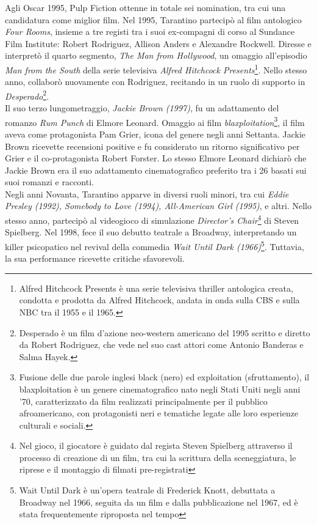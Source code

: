 \documentclass[12pt]{article} %
\begin{document}
\begin{flushleft}
    Agli Oscar 1995, Pulp Fiction ottenne in totale sei nomination, tra cui una candidatura come miglior film.
    Nel 1995, Tarantino partecipò al film antologico \textit{Four Rooms}, insieme a tre registi tra i suoi ex-compagni di corso al Sundance Film Institute: Robert Rodriguez, Allison Anders e Alexandre Rockwell. 
    Diresse e interpretò il quarto segmento, \textit{The Man from Hollywood}, un omaggio all'episodio \textit{Man from the South} della serie televisiva \textit{Alfred Hitchcock Presents}\footnote{Alfred Hitchcock Presents è una serie televisiva thriller antologica creata, condotta e prodotta da Alfred Hitchcock, andata in onda sulla CBS e sulla NBC tra il 1955 e il 1965. }. 
    Nello stesso anno, collaborò nuovamente con Rodriguez, recitando in un ruolo di supporto in \textit{Desperado}\footnote{Desperado è un film d'azione neo-western americano del 1995 scritto e diretto da Robert Rodriguez, che vede nel suo cast attori come Antonio Banderas e Salma Hayek.}. 
    \\\vspace{1cm} Il suo terzo lungometraggio, \textit{Jackie Brown (1997)}, fu un adattamento del romanzo \textit{Rum Punch} di Elmore Leonard. 
    Omaggio ai film \textit{blaxploitation}\footnote{Fusione delle due parole inglesi black (nero) ed exploitation (sfruttamento), il blaxploitation è un genere cinematografico nato negli Stati Uniti negli anni '70, caratterizzato da film realizzati principalmente per il pubblico afroamericano, con protagonisti neri e tematiche legate alle loro esperienze culturali e sociali.}, 
    il film aveva come protagonista Pam Grier, icona del genere negli anni Settanta.
    Jackie Brown ricevette recensioni positive e fu considerato un ritorno significativo per Grier e il co-protagonista Robert Forster.
    Lo stesso Elmore Leonard dichiarò che Jackie Brown era il suo adattamento cinematografico preferito tra i 26 basati sui suoi romanzi e racconti. \\\vspace{1cm}
    Negli anni Novanta, Tarantino apparve in diversi ruoli minori, tra cui \textit{Eddie Presley (1992), Somebody to Love (1994), All-American Girl (1995)}, e altri. Nello stesso anno, partecipò al videogioco di simulazione \textit{Director's Chair}\footnote{Nel gioco, il giocatore è guidato dal regista Steven Spielberg attraverso il processo di creazione di un film, tra cui la scrittura della sceneggiatura, le riprese e il montaggio di filmati pre-registrati} di Steven Spielberg. 
    Nel 1998, fece il suo debutto teatrale a Broadway, interpretando un killer psicopatico nel revival della commedia \textit{Wait Until Dark (1966)}\footnote{Wait Until Dark è un'opera teatrale di Frederick Knott, debuttata a Broadway nel 1966, seguita da un film e dalla pubblicazione nel 1967, ed è stata frequentemente riproposta nel tempo}. Tuttavia, la sua performance ricevette critiche sfavorevoli.
\end{flushleft}
\break
\end{document}
